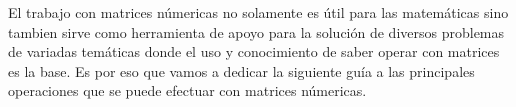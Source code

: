 El trabajo con matrices númericas no solamente es útil para las matemáticas sino tambien sirve como herramienta de apoyo para la solución de diversos problemas de variadas temáticas donde el uso y conocimiento de saber operar con matrices es la base. Es por eso que vamos a dedicar la siguiente guía a las principales operaciones que se puede efectuar con matrices númericas. 